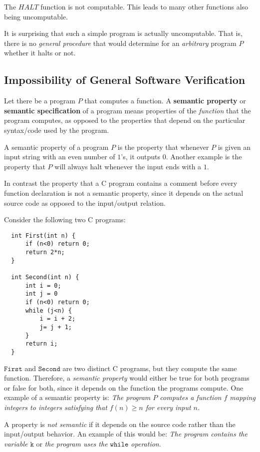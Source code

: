 \documentclass{article}
\begin{document}
  \begin{theorem}
  The $HALT$ function is not computable. This leads to many other functions also being uncomputable. 
  \end{theorem}

  It is surprising that such a simple program is actually uncomputable. That is, there is no \textit{general procedure} that would determine for an \textit{arbitrary} program $P$ whether it halts or not. 

  \subsection{Impossibility of General Software Verification}
  \begin{definition}
  Let there be a program $P$ that computes a function. A \textbf{semantic property} or \textbf{semantic specification} of a program means properties of the \textit{function} that the program computes, as opposed to the properties that depend on the particular syntax/code used by the program. 
  \end{definition}

  \begin{example}
  A semantic property of a program $P$ is the property that whenever $P$ is given an input string with an even number of $1$'s, it outputs $0$. Another example is the property that $P$ will always halt whenever the input ends with a $1$. 

  In contrast the property that a C program contains a comment before every function declaration is not a semantic property, since it depends on the actual source code as opposed to the input/output relation. 
  \end{example}

  \begin{example}
  Consider the following two C programs: 
  \begin{lstlisting}
  int First(int n) {
      if (n<0) return 0; 
      return 2*n;
  }

  int Second(int n) {
      int i = 0;
      int j = 0
      if (n<0) return 0; 
      while (j<n) {
          i = i + 2;
          j= j + 1; 
      }
      return i; 
  }
  \end{lstlisting}
  $\texttt{First}$ and $\texttt{Second}$ are two distinct C programs, but they compute the same function. Therefore, a \textit{semantic property} would either be true for both programs or false for both, since it depends on the function the programs compute. One example of a semantic property is: \textit{The program $P$ computes a function $f$ mapping integers to integers satisfying that $f(n) \geq n$ for every input $n$.} 

  A property is \textit{not semantic} if it depends on the source code rather than the input/output behavior. An example of this would be: \textit{The program contains the variable $\texttt{k}$} or \textit{the program uses the $\texttt{while}$ operation}. 
  \end{example}
\end{document}
